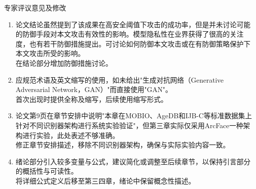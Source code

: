 \documentclass[aspectratio=169,12pt]{beamer}
\begin{document}
\begin{frame}{专家评议意见及修改}
\footnotesize
\begin{enumerate}
\item  论文结论虽然提到了该成果在高安全阈值下攻击的成功率，但是并未讨论可能的防御手段对本文攻击有效性的影响。模型隐私性在业界获得了很高的关注度，也有若干防御措施提出。可讨论如何防御本文攻击或在有防御策略保护下本文攻击所受的影响。\\
\textcolor{hitblue}{在结论部分增加防御措施讨论。}

\item  应规范术语及英文缩写的使用，如未给出"生成对抗网络（Generative Adversarial Network，GAN）"而直接使用"GAN"。\\
\textcolor{hitblue}{首次出现时提供全称及缩写，后续使用缩写形式。}

\item  论文第9页在章节安排中说明"本章在MOBIO、AgeDB和IJB-C等标准数据集上针对不同识别器架构进行系统实验验证"，但第三章实际仅采用ArcFace一种架构进行实验，此处表述不够准确。\\
\textcolor{hitblue}{修正章节安排描述，移除不同识别器架构，确保与实际实验内容一致。}

\item  绪论部分引入较多变量与公式，建议简化或调整至后续章节，以保持引言部分的概括性与可读性。\\
\textcolor{hitblue}{将详细公式定义后移至第三四章，绪论中保留概念性描述。}

\end{enumerate}


\end{frame} %
\end{document}
